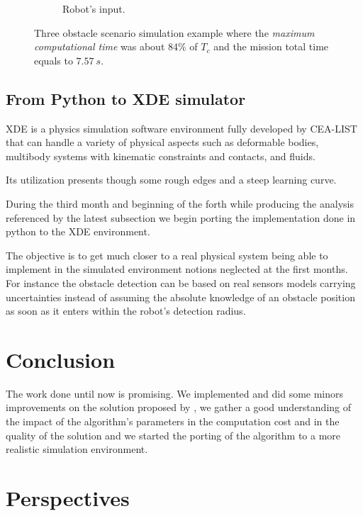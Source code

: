 \begin{figure}[!h]
\begin{subfigure}[b]{0.48\textwidth}
                \caption{Robot's input.}\label{fig:rinput}
        \end{subfigure}
        \caption{Three obstacle scenario simulation example where the \textit{maximum computational time} was about 84\% of $T_c$ and the mission total time equals to $7.57\ s$.}\label{fig:uni3}
\end{figure}

\subsection{From Python to XDE simulator}

XDE is a physics simulation software environment fully developed by CEA-LIST that can handle a variety of physical aspects such as deformable bodies, multibody systems with kinematic constraints and contacts, and fluids.

Its utilization presents though some rough edges and a steep learning curve.

During the third month and beginning of the forth while producing the analysis referenced by the latest subsection we begin porting the implementation done in python to the XDE environment. 

The objective is to get much closer to a real physical system being able to implement in the simulated environment notions neglected at the first months. For instance the obstacle detection can be based on real sensors models carrying uncertainties instead of assuming the absolute knowledge of an obstacle position as soon as it enters within the robot's detection radius.

\section{Conclusion}

The work done until now is promising. We implemented and did some minors improvements on the solution proposed by \cite{Defoort2007a}, we gather a good understanding of the impact of the algorithm's parameters in the computation cost and in the quality of the solution and we started the porting of the algorithm to a more realistic simulation environment.
\section{Perspectives}

